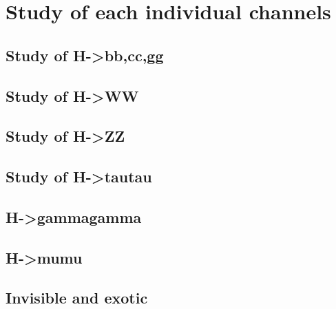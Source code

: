 \section{Study of each individual channels}
\label{sec:channels}

\subsection{Study of H->bb,cc,gg}
\subsection{Study of H->WW}
\subsection{Study of H->ZZ}
\subsection{Study of H->tautau}
\subsection{H->gammagamma}
\subsection{H->mumu}
\subsection{Invisible and exotic}
